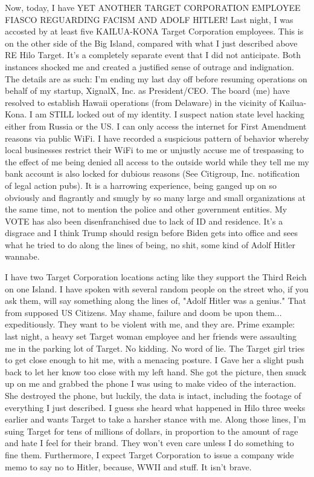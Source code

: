 \documentclass[a4paper]{arthur-letter}
\begin{document}
\begin{letter}
            Now, today, I have YET ANOTHER TARGET CORPORATION EMPLOYEE FIASCO REGUARDING FACISM AND ADOLF HITLER! Last night, I was accosted by at least five KAILUA-KONA Target Corporation employees. This is on the other side of the Big Island, compared with what I just described above RE Hilo Target. It's a completely separate event that I did not anticipate. Both instances shocked me and created a justified sense of outrage and indignation. The details are as such: I'm ending my last day off before resuming operations on behalf of my startup, XignalX, Inc. as President/CEO. The board (me) have resolved to establish Hawaii operations (from Delaware) in the vicinity of Kailua-Kona. I am STILL locked out of my identity. I suspect nation state level hacking either from Russia or the US. I can only access the internet for First Amendment reasons via public WiFi. I have recorded a suspicious pattern of behavior whereby local businesses restrict their WiFi to me or unjustly accuse me of trespassing to the effect of me being denied all access to the outside world while they tell me my bank account is also locked for dubious reasons (See Citigroup, Inc. notification of legal action pubs). It is a harrowing experience, being ganged up on so obviously and flagrantly and smugly by so many large and small organizations at the same time, not to mention the police and other government entities. My VOTE has also been disenfranchised due to lack of ID and residence. It's a disgrace and I think Trump should resign before Biden gets into office and sees what he tried to do along the lines of being, no shit, some kind of Adolf Hitler wannabe.
            
            I have two Target Corporation locations acting like they support the Third Reich on one Island. I have spoken with several random people on the street who, if you ask them, will say something along the lines of, "Adolf Hitler was a genius." That from supposed US Citizens. May shame, failure and doom be upon them... expeditiously. They want to be violent with me, and they are. Prime example: last night, a heavy set Target woman employee and her friends were assaulting me in the parking lot of Target. No kidding. No word of lie. The Target girl tries to get close enough to hit  me, with a menacing posture. I Gave her a slight push back to let her know too close with my left hand. She got the picture, then snuck up on me and grabbed the phone I was using to make video of the interaction. She destroyed the phone, but luckily, the data is intact, including the footage of everything I just described. I guess she heard what happened in Hilo three weeks earlier and wants Target to take a harsher stance with me. Along those lines, I'm suing Target for tens of millions of dollars, in proportion to the amount of rage and hate I feel for their brand. They won't even care unless I do something to fine them. Furthermore, I expect Target Corporation to issue a company wide memo to say no to Hitler, because, WWII and stuff. It isn't brave. 
            

\end{letter}
\end{document}
